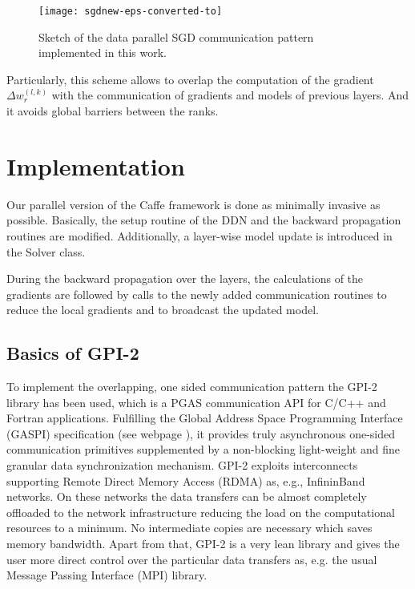 \documentclass[twoside,twocolumn]{article}
\begin{document}
\begin{figure}[htbp]
\centering%
\texttt{[image: sgdnew-eps-converted-to]}
\caption{Sketch of the data parallel SGD communication pattern implemented in this work.}
\label{fig:ourSGD}
\end{figure}

Particularly, this scheme allows to overlap the computation of the
gradient $\Delta w^{(l,k)}_r$ with the communication of gradients and models of
previous layers. And it avoids global barriers between the ranks.



\section{Implementation}

\label{s:implementation}

Our parallel version of the Caffe framework is done as minimally invasive
as possible. Basically, the setup routine of the DDN and the backward
propagation routines are modified. Additionally, a layer-wise model update
is introduced in the Solver class.

During the backward propagation over the layers, the calculations
of the gradients are followed by calls to the newly added communication 
routines to reduce the local gradients and to broadcast the updated model.

\subsection{Basics of GPI-2}


To implement the overlapping, one sided communication pattern the GPI-2 library
has been used, which is a PGAS
communication API for C/C++ and Fortran applications. Fulfilling the
Global Address Space Programming Interface (GASPI) specification (see webpage \cite{gaspi}),
it provides truly asynchronous one-sided communication primitives supplemented by
a non-blocking light-weight and fine granular data synchronization mechanism.
GPI-2 exploits interconnects supporting
Remote Direct Memory Access (RDMA) as, e.g., InfininBand networks.
On these networks the data transfers can be almost completely offloaded
to the network infrastructure reducing the load on the computational resources
to a minimum. No intermediate copies are necessary which saves memory
bandwidth. Apart from that, GPI-2 is a very lean library and gives
the user more direct control over the particular data transfers as,
e.g. the usual Message Passing Interface (MPI) library.
\end{document}
